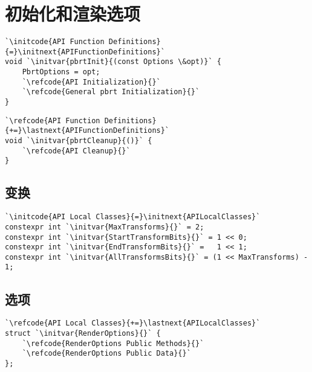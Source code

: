 \section{初始化和渲染选项}\label{sec:初始化和渲染选项}

\begin{lstlisting}
`\initcode{API Function Definitions}{=}\initnext{APIFunctionDefinitions}`
void `\initvar{pbrtInit}{(const Options \&opt)}` {
    PbrtOptions = opt;
    `\refcode{API Initialization}{}`
    `\refcode{General pbrt Initialization}{}`
}
\end{lstlisting}

\begin{lstlisting}
`\refcode{API Function Definitions}{+=}\lastnext{APIFunctionDefinitions}` 
void `\initvar{pbrtCleanup}{()}` {
    `\refcode{API Cleanup}{}`
}
\end{lstlisting}

\subsection{变换}\label{sub:变换}
\begin{lstlisting}
`\initcode{API Local Classes}{=}\initnext{APILocalClasses}` 
constexpr int `\initvar{MaxTransforms}{}` = 2;
constexpr int `\initvar{StartTransformBits}{}` = 1 << 0;
constexpr int `\initvar{EndTransformBits}{}` =   1 << 1;
constexpr int `\initvar{AllTransformsBits}{}` = (1 << MaxTransforms) - 1;
\end{lstlisting}

\subsection{选项}\label{sub:选项}
\begin{lstlisting}
`\refcode{API Local Classes}{+=}\lastnext{APILocalClasses}` 
struct `\initvar{RenderOptions}{}` {
    `\refcode{RenderOptions Public Methods}{}`
    `\refcode{RenderOptions Public Data}{}`
};
\end{lstlisting}